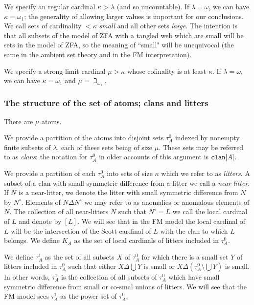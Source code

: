 \documentclass[12pt]{article}
\begin{document}
We specify an regular cardinal $\kappa>\lambda$ (and so uncountable).   If $\lambda=\omega$, we can have $\kappa=\omega_1$;  the generality of allowing larger values is important for our conclusions.  We call sets of cardinality $<\kappa$ {\em small\/} and all other sets
{\em large}.  The intention is that all subsets of the model of ZFA with a tangled web which are small will be sets in the model of ZFA, so the meaning of ``small" will be unequivocal (the same in the ambient set theory and in the FM interpretation).

We specify a strong limit cardinal $\mu>\kappa$ whose cofinality is at least $\kappa$.  If $\lambda=\omega$, we can have $\kappa=\omega_1$ and $\mu=\beth_{\omega_1}$.

\newpage

\subsubsection{The structure of the set of atoms; clans and litters}

There are $\mu$ atoms.

We provide a partition of the atoms into disjoint sets $\tau^0_A$ indexed by nonempty finite subsets of $\lambda$, each of these sets being of size $\mu$.
These sets may be referred to as {\em clans}: the notation for $\tau^0_A$ in older accounts of this argument is ${\tt clan}[A]$.

We provide a partition of each $\tau^0_A$ into sets of size $\kappa$ which we refer to as {\em litters\/}.  A subset of a clan with small symmetric difference from a litter
we call a {\em near-litter\/}.  If $N$ is a near-litter, we denote the litter with small symmetric difference from $N$ by $N^{\circ}$.  Elements of $N \Delta N^{\circ}$ we may refer to as anomalies or anomalous elements of $N$.  The collection of all near-litters $N$ such that $N^{\circ}=L$ we call the local cardinal of $L$ and denote by $[L]$.  We will see that in the FM model the local cardinal of $L$ will be the intersection of the Scott cardinal of $L$ with the clan to which $L$ belongs.  We define $K_A$ as the set of local cardinals of litters included in $\tau^0_A$.

We define $\tau^1_A$ as the set of all subsets $X$ of $\tau^0_A$ for which there is a small set $Y$ of litters included in $\tau^0_A$ such that either $X \Delta \bigcup Y$ is small
or $X \Delta (\tau^0_A \setminus \bigcup Y)$ is small.  In other words, $\tau^1_A$ is the collection of all subsets of $\tau^0_A$ which have small symmetric difference from small or co-smal unions of litters.  We will see that the FM model sees $\tau^1_A$ as the power set of $\tau^0_A$.
\end{document}
